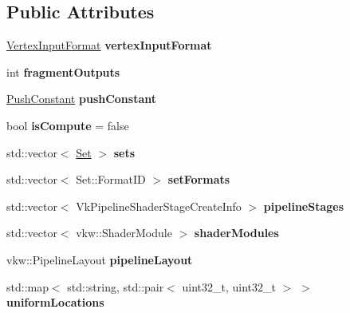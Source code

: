 \subsection*{Public Attributes}
\begin{DoxyCompactItemize}
\item 
\mbox{\label{structblaze_1_1spirv_1_1Shader_ab64ee55b8c711d11fed9e527d1c785eb}} 
\hyperlink{structblaze_1_1VertexInputFormat}{Vertex\+Input\+Format} {\bfseries vertex\+Input\+Format}
\item 
\mbox{\label{structblaze_1_1spirv_1_1Shader_a8722e394db106c5ed51ca05e056d880b}} 
int {\bfseries fragment\+Outputs}
\item 
\mbox{\label{structblaze_1_1spirv_1_1Shader_a82b2ed73c8589a54620e479162b8f41a}} 
\hyperlink{structblaze_1_1spirv_1_1Shader_1_1PushConstant}{Push\+Constant} {\bfseries push\+Constant}
\item 
\mbox{\label{structblaze_1_1spirv_1_1Shader_a6588c3eabc1b7e90e6e2b6533b7180d6}} 
bool {\bfseries is\+Compute} = false
\item 
\mbox{\label{structblaze_1_1spirv_1_1Shader_ae46b7d5db6c1f5243dc309337c113994}} 
std\+::vector$<$ \hyperlink{structblaze_1_1spirv_1_1Shader_1_1Set}{Set} $>$ {\bfseries sets}
\item 
\mbox{\label{structblaze_1_1spirv_1_1Shader_a103de1b45c2f19d4fb7d6698d36c4a96}} 
std\+::vector$<$ Set\+::\+Format\+ID $>$ {\bfseries set\+Formats}
\item 
\mbox{\label{structblaze_1_1spirv_1_1Shader_a8f8466e238f04e9932ae956db352e39d}} 
std\+::vector$<$ Vk\+Pipeline\+Shader\+Stage\+Create\+Info $>$ {\bfseries pipeline\+Stages}
\item 
\mbox{\label{structblaze_1_1spirv_1_1Shader_af193b80af1de1276aeab7a30122f0c84}} 
std\+::vector$<$ vkw\+::\+Shader\+Module $>$ {\bfseries shader\+Modules}
\item 
\mbox{\label{structblaze_1_1spirv_1_1Shader_acc55ff4291f82c265e42db7ffbd2549c}} 
vkw\+::\+Pipeline\+Layout {\bfseries pipeline\+Layout}
\item 
\mbox{\label{structblaze_1_1spirv_1_1Shader_a6bc8e60d9b3ae63f80e92f563508df00}} 
std\+::map$<$ std\+::string, std\+::pair$<$ uint32\+\_\+t, uint32\+\_\+t $>$ $>$ {\bfseries uniform\+Locations}
\end{DoxyCompactItemize}
